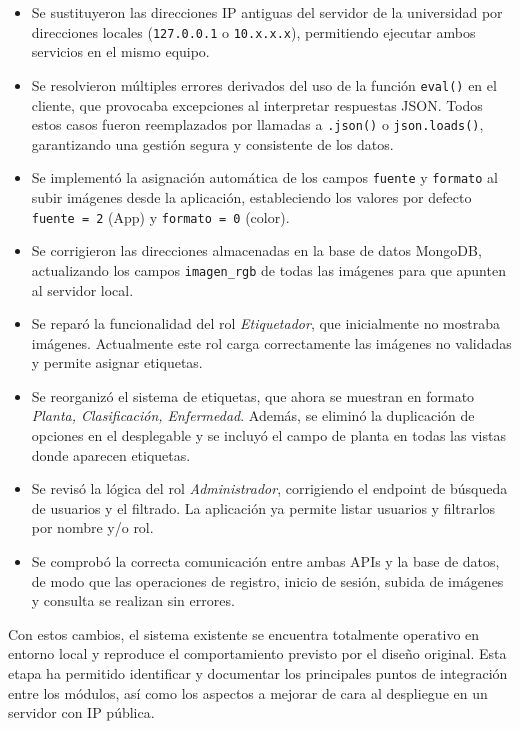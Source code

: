 \documentclass[12pt,a4paper]{article}
\begin{document}
\begin{itemize}
    \item Se sustituyeron las direcciones IP antiguas del servidor de la universidad por direcciones locales (\texttt{127.0.0.1} o \texttt{10.x.x.x}), permitiendo ejecutar ambos servicios en el mismo equipo.
    \item Se resolvieron múltiples errores derivados del uso de la función \texttt{eval()} en el cliente, que provocaba excepciones al interpretar respuestas JSON. Todos estos casos fueron reemplazados por llamadas a \texttt{.json()} o \texttt{json.loads()}, garantizando una gestión segura y consistente de los datos.
    \item Se implementó la asignación automática de los campos \texttt{fuente} y \texttt{formato} al subir imágenes desde la aplicación, estableciendo los valores por defecto \texttt{fuente = 2} (App) y \texttt{formato = 0} (color).
    \item Se corrigieron las direcciones almacenadas en la base de datos MongoDB, actualizando los campos \texttt{imagen\_rgb} de todas las imágenes para que apunten al servidor local.
    \item Se reparó la funcionalidad del rol \textit{Etiquetador}, que inicialmente no mostraba imágenes. Actualmente este rol carga correctamente las imágenes no validadas y permite asignar etiquetas.
    \item Se reorganizó el sistema de etiquetas, que ahora se muestran en formato \textit{Planta, Clasificación, Enfermedad}. Además, se eliminó la duplicación de opciones en el desplegable y se incluyó el campo de planta en todas las vistas donde aparecen etiquetas.
    \item Se revisó la lógica del rol \textit{Administrador}, corrigiendo el endpoint de búsqueda de usuarios y el filtrado. La aplicación ya permite listar usuarios y filtrarlos por nombre y/o rol.
    \item Se comprobó la correcta comunicación entre ambas APIs y la base de datos, de modo que las operaciones de registro, inicio de sesión, subida de imágenes y consulta se realizan sin errores.
\end{itemize}

Con estos cambios, el sistema existente se encuentra totalmente operativo en entorno local y reproduce el comportamiento previsto por el diseño original. Esta etapa ha permitido identificar y documentar los principales puntos de integración entre los módulos, así como los aspectos a mejorar de cara al despliegue en un servidor con IP pública.
\end{document}
